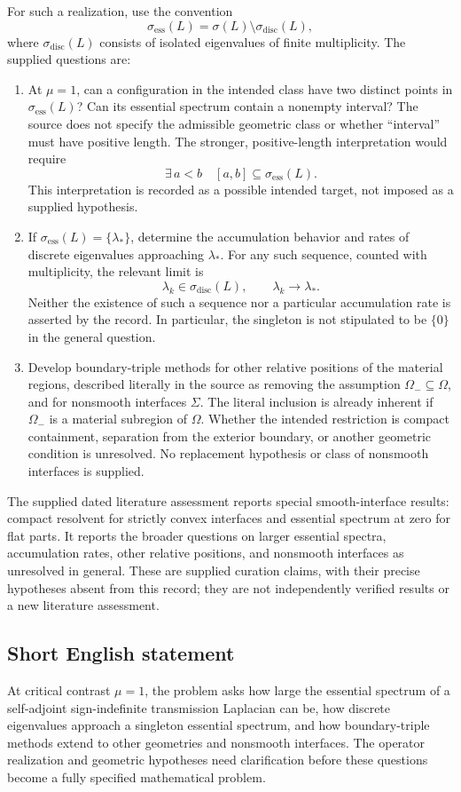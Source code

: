 \documentclass[11pt]{article}
\begin{document}
For such a realization, use the convention
\[
 \sigma_{\mathrm{ess}}(L)=\sigma(L)\setminus\sigma_{\mathrm{disc}}(L),
\]
where \(\sigma_{\mathrm{disc}}(L)\) consists of isolated eigenvalues of finite multiplicity. The supplied questions are:
\begin{enumerate}
\item At \(\mu=1\), can a configuration in the intended class have two distinct points in \(\sigma_{\mathrm{ess}}(L)\)? Can its essential spectrum contain a nonempty interval? The source does not specify the admissible geometric class or whether ``interval'' must have positive length. The stronger, positive-length interpretation would require
\[
 \exists\,a<b\quad [a,b]\subseteq\sigma_{\mathrm{ess}}(L).
\]
This interpretation is recorded as a possible intended target, not imposed as a supplied hypothesis.
\item If \(\sigma_{\mathrm{ess}}(L)=\{\lambda_*\}\), determine the accumulation behavior and rates of discrete eigenvalues approaching \(\lambda_*\). For any such sequence, counted with multiplicity, the relevant limit is
\[
 \lambda_k\in\sigma_{\mathrm{disc}}(L),\qquad \lambda_k\longrightarrow\lambda_*.
\]
Neither the existence of such a sequence nor a particular accumulation rate is asserted by the record. In particular, the singleton is not stipulated to be \(\{0\}\) in the general question.
\item Develop boundary-triple methods for other relative positions of the material regions, described literally in the source as removing the assumption \(\Omega_-\subseteq\Omega\), and for nonsmooth interfaces \(\Sigma\). The literal inclusion is already inherent if \(\Omega_-\) is a material subregion of \(\Omega\). Whether the intended restriction is compact containment, separation from the exterior boundary, or another geometric condition is unresolved. No replacement hypothesis or class of nonsmooth interfaces is supplied.
\end{enumerate}

The supplied dated literature assessment reports special smooth-interface results: compact resolvent for strictly convex interfaces and essential spectrum at zero for flat parts. It reports the broader questions on larger essential spectra, accumulation rates, other relative positions, and nonsmooth interfaces as unresolved in general. These are supplied curation claims, with their precise hypotheses absent from this record; they are not independently verified results or a new literature assessment.
\subsection{Short English statement}
At critical contrast \(\mu=1\), the problem asks how large the essential spectrum of a self-adjoint sign-indefinite transmission Laplacian can be, how discrete eigenvalues approach a singleton essential spectrum, and how boundary-triple methods extend to other geometries and nonsmooth interfaces. The operator realization and geometric hypotheses need clarification before these questions become a fully specified mathematical problem.
\end{document}
